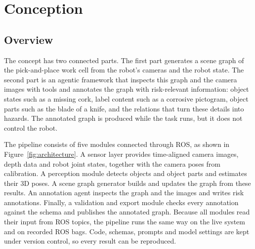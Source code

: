 \section{Conception}
\label{sec:conception}

\subsection{Overview}
\label{sec:concept-overview}

The concept has two connected parts. The first part generates a scene graph
of the pick-and-place work cell from the robot's cameras and the robot state.
The second part is an agentic framework that inspects this graph and the
camera images with tools and annotates the graph with risk-relevant
information: object states such as a missing cork, label content such as a
corrosive pictogram, object parts such as the blade of a knife, and the
relations that turn these details into hazards. The annotated graph is
produced while the task runs, but it does not control the robot.

The pipeline consists of five modules connected through ROS, as shown in
Figure~\ref{fig:architecture}. A sensor layer provides time-aligned camera
images, depth data and robot joint states, together with the camera poses
from calibration. A perception module detects objects and object parts and
estimates their 3D poses. A scene graph generator builds and updates the
graph from these results. An annotation agent inspects the graph and the
images and writes risk annotations. Finally, a validation and export module
checks every annotation against the schema and publishes the annotated
graph. Because all modules read their input from ROS topics, the pipeline
runs the same way on the live system and on recorded ROS bags. Code,
schemas, prompts and model settings are kept under version control, so
every result can be reproduced.

